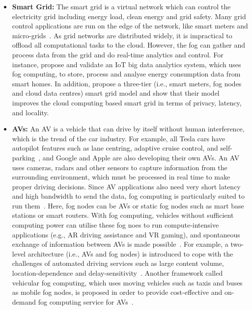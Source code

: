 \documentclass[11pt]{phdthesis}
\begin{document}
\begin{itemize}
	\item \textbf{Smart Grid:} The smart grid is a virtual network which can control the electricity grid including energy load, clean energy and grid safety. Many grid control applications are run on the edge of the network, like smart meters and micro-grids~\citep{wei2014optimally}. As grid networks are distributed widely, it is impractical to offload all computational tasks to the cloud. However, the fog can gather and process data from the grid and do real-time analytics and control. For instance, \citet{singh2018iot} propose and validate an IoT big data analytics system, which uses fog computing, to store, process and analyse energy consumption data from smart homes. In addition, \citet{okay2016fog} propose a three-tier (i.e., smart meters, fog nodes and cloud data centres) smart grid model and show that their model improves the cloud computing based smart grid in terms of privacy, latency, and locality.
	
	\item \textbf{AVs:} An AV is a vehicle that can drive by itself without human interference, which is the trend of the car industry. For example, all Tesla cars have autopilot features such as lane centring, adaptive cruise control, and self-parking~\citep{endsley2017autonomous}, and Google and Apple are also developing their own AVs. An AV uses cameras, radars and other sensors to capture information from the surrounding environment, which must be processed in real time to make proper driving decisions. Since AV applications also need very short latency and high bandwidth to send the data, fog computing is particularly suited to run them~\citep{peter2015fog}. Here, fog nodes can be AVs or static fog nodes such as mart base stations or smart routers. With fog computing, vehicles without sufficient computing power can utilise these fog noes to run compute-intensive applications (e.g., AR driving assistance and VR gaming), and spontaneous exchange of information between AVs is made possible~\citep{xiao2017vehicular}. For example, a two-level architecture (i.e., AVs and fog nodes) is introduced to cope with the challenges of automated driving services such as large content volume, location-dependence and delay-sensitivity~\citep{yuan2018toward}. Another framework called vehicular fog computing, which uses moving vehicles such as taxis and buses as mobile fog nodes, is proposed in order to provide cost-effective and on-demand fog computing service for AVs~\citep{xiao2017vehicular}.
\end{itemize}
\end{document}
